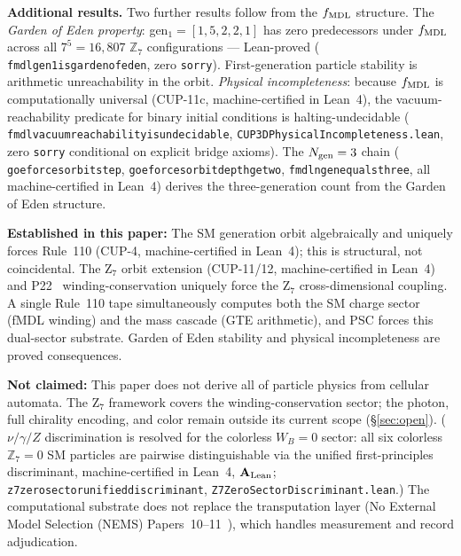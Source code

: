\documentclass[11pt]{article}
\theoremstyle{remark}
\newcommand{\lean}[1]{%
  \penalty-100
  \begingroup\def\_{\textunderscore\allowbreak}\texttt{#1}\endgroup}
\newcommand{\CatAL}{\ensuremath{\textbf{A}_{\rm Lean}}}
\begin{document}
\medskip

\textbf{Additional results.}
Two further results follow from the $f_{\rm MDL}$ structure.
The \emph{Garden of Eden property}: gen$_1 = [1,5,2,2,1]$ has zero predecessors under
$f_{\rm MDL}$ across all $7^5 = 16{,}807$ $\mathbb{Z}_7$ configurations --- Lean-proved
(\lean{fmdl\_gen1\_is\_garden\_of\_eden}, zero \texttt{sorry}).
First-generation particle stability is arithmetic unreachability in the orbit.
\emph{Physical incompleteness}: because $f_{\rm MDL}$ is computationally universal
(CUP-11c, machine-certified in Lean~4), the vacuum-reachability predicate for binary initial conditions
is halting-undecidable (\lean{fmdl\_vacuum\_reachability\_is\_undecidable},
\lean{CUP3DPhysicalIncompleteness.lean}, zero \texttt{sorry} conditional on explicit
bridge axioms). The $N_{\rm gen}=3$ chain
(\lean{goe\_forces\_orbit\_step}, \lean{goe\_forces\_orbit\_depth\_ge\_two},
\lean{fmdl\_ngen\_equals\_three}, all machine-certified in Lean~4) derives the three-generation count
from the Garden of Eden structure.

\medskip

\begin{tcolorbox}[colback=orange!4,colframe=orange!55!black,
  title={\textbf{What this paper does and does not claim}},
  fonttitle=\bfseries,left=6pt,right=6pt,top=5pt,bottom=5pt]
\small
\textbf{Established in this paper:} The SM generation orbit algebraically and uniquely forces
Rule~110 (CUP-4, machine-certified in Lean~4); this is structural, not coincidental. The Z$_7$ orbit
extension (CUP-11/12, machine-certified in Lean~4) and P22~\cite{Spivack2026_UGPDynamics} winding-conservation uniquely force the
Z$_7$ cross-dimensional coupling. A single Rule~110 tape simultaneously computes both
the SM charge sector (fMDL winding) and the mass cascade (GTE arithmetic), and PSC
forces this dual-sector substrate. Garden of Eden stability and physical incompleteness
are proved consequences.

\textbf{Not claimed:} This paper does not derive all of particle physics from cellular automata.
The Z$_7$ framework covers the winding-conservation sector; the photon, full chirality
encoding, and color remain outside its current scope (\S\ref{sec:open}).
($\nu/\gamma/Z$ discrimination is resolved for the colorless $W_B{=}0$ sector: all six
colorless $\mathbb{Z}_7=0$ SM particles are pairwise distinguishable via the unified
first-principles discriminant, machine-certified in Lean~4, $\CatAL$;
\lean{z7\_zero\_sector\_unified\_discriminant}, \lean{Z7ZeroSectorDiscriminant.lean}.)
The computational substrate does not replace the transputation layer (No External Model Selection (NEMS) Papers~10--11~\cite{SpivackUGP2024}),
which handles measurement and record adjudication.
\end{tcolorbox}
\end{document}
